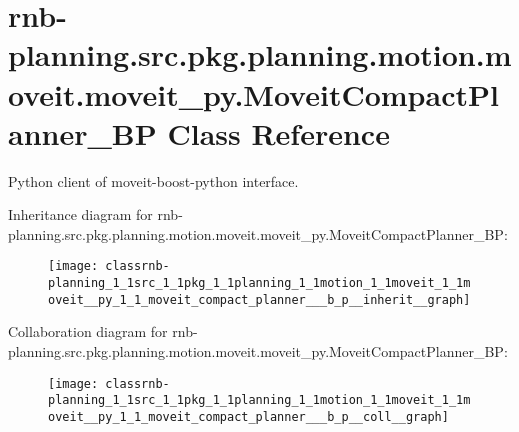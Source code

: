 \hypertarget{classrnb-planning_1_1src_1_1pkg_1_1planning_1_1motion_1_1moveit_1_1moveit__py_1_1_moveit_compact_planner___b_p}{}\section{rnb-\/planning.src.\+pkg.\+planning.\+motion.\+moveit.\+moveit\+\_\+py.\+Moveit\+Compact\+Planner\+\_\+\+BP Class Reference}
\label{classrnb-planning_1_1src_1_1pkg_1_1planning_1_1motion_1_1moveit_1_1moveit__py_1_1_moveit_compact_planner___b_p}


Python client of moveit-\/boost-\/python interface.  




Inheritance diagram for rnb-\/planning.src.\+pkg.\+planning.\+motion.\+moveit.\+moveit\+\_\+py.\+Moveit\+Compact\+Planner\+\_\+\+BP\+:
\nopagebreak
\begin{figure}[H]
\begin{center}
\leavevmode
\texttt{[image: classrnb-planning\_1\_1src\_1\_1pkg\_1\_1planning\_1\_1motion\_1\_1moveit\_1\_1moveit\_\_py\_1\_1\_moveit\_compact\_planner\_\_\_b\_p\_\_inherit\_\_graph]}
\end{center}
\end{figure}


Collaboration diagram for rnb-\/planning.src.\+pkg.\+planning.\+motion.\+moveit.\+moveit\+\_\+py.\+Moveit\+Compact\+Planner\+\_\+\+BP\+:
\nopagebreak
\begin{figure}[H]
\begin{center}
\leavevmode
\texttt{[image: classrnb-planning\_1\_1src\_1\_1pkg\_1\_1planning\_1\_1motion\_1\_1moveit\_1\_1moveit\_\_py\_1\_1\_moveit\_compact\_planner\_\_\_b\_p\_\_coll\_\_graph]}
\end{center}
\end{figure}
